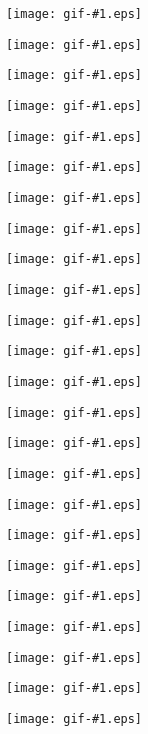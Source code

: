 \documentclass{article}
\def\f1#1{\texttt{[image: gif-\#1.eps]}}
\begin{document}
\f1{01}

\f1{02}

\f1{03}

\f1{04}

\f1{05}

\f1{06}

\f1{07}

\f1{08}

\f1{09}

\f1{10}

\f1{11}

\f1{12}

\f1{13}

\f1{14}

\f1{15}

\f1{16}

\f1{17}

\f1{18}

\f1{19}

\f1{20}

\f1{21}

\f1{22}

\f1{23}

\f1{24}
\end{document}
